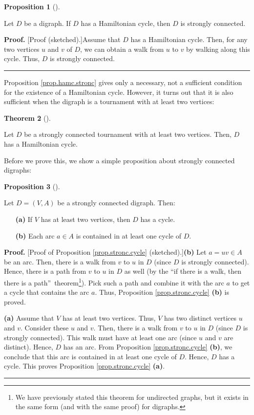 \documentclass[numbers=enddot,12pt,final,onecolumn,notitlepage]{scrartcl}%
\numberwithin{exer}{subsection}
\theoremstyle{definition}
\newtheorem{theo}{Theorem}[subsection]
\newenvironment{theorem}[1][]
{\begin{theo}[#1]\begin{leftbar}}
{\end{leftbar}\end{theo}}
\newtheorem{prop}[theo]{Proposition}
\newenvironment{proposition}[1][]
{\begin{prop}[#1]\begin{leftbar}}
{\end{leftbar}\end{prop}}
\newenvironment{proof}[1][Proof]{\noindent\textbf{#1.} }{\ \rule{0.5em}{0.5em}}
\begin{document}
\begin{proposition}
\label{prop.hamc.stronc}Let $D$ be a digraph. If $D$ has a Hamiltonian cycle,
then $D$ is strongly connected.
\end{proposition}

\begin{proof}
[Proof (sketched).]Assume that $D$ has a Hamiltonian cycle. Then, for any two
vertices $u$ and $v$ of $D$, we can obtain a walk from $u$ to $v$ by walking
along this cycle. Thus, $D$ is strongly connected.
\end{proof}

Proposition \ref{prop.hamc.stronc} gives only a necessary, not a sufficient
condition for the existence of a Hamiltonian cycle. However, it turns out that
it is also sufficient when the digraph is a tournament with at least two vertices:

\begin{theorem}
[Camion's theorem]\label{thm.hamc.camion}Let $D$ be a strongly connected
tournament with at least two vertices. Then, $D$ has a Hamiltonian cycle.
\end{theorem}

Before we prove this, we show a simple proposition about strongly connected digraphs:

\begin{proposition}
\label{prop.stronc.cycle}Let $D=\left(  V,A\right)  $ be a strongly connected
digraph. Then:

\begin{enumerate}
\item[\textbf{(a)}] If $V$ has at least two vertices, then $D$ has a cycle.

\item[\textbf{(b)}] Each arc $a\in A$ is contained in at least one cycle of
$D$.
\end{enumerate}
\end{proposition}

\begin{proof}
[Proof of Proposition \ref{prop.stronc.cycle} (sketched).]\textbf{(b)} Let
$a=uv\in A$ be an arc. Then, there is a walk from $v$ to $u$ in $D$ (since $D$
is strongly connected). Hence, there is a path from $v$ to $u$ in $D$ as well
(by the \textquotedblleft if there is a walk, then there is a
path\textquotedblright\ theorem\footnote{We have previously stated this
theorem for undirected graphs, but it exists in the same form (and with the
same proof) for digraphs.}). Pick such a path and combine it with the arc $a$
to get a cycle that contains the arc $a$. Thus, Proposition
\ref{prop.stronc.cycle} \textbf{(b)} is proved. \medskip

\textbf{(a)} Assume that $V$ has at least two vertices. Thus, $V$ has two
distinct vertices $u$ and $v$. Consider these $u$ and $v$. Then, there is a
walk from $v$ to $u$ in $D$ (since $D$ is strongly connected). This walk must
have at least one arc (since $u$ and $v$ are distinct). Hence, $D$ has an arc.
From Proposition \ref{prop.stronc.cycle} \textbf{(b)}, we conclude that this
arc is contained in at least one cycle of $D$. Hence, $D$ has a cycle. This
proves Proposition \ref{prop.stronc.cycle} \textbf{(a)}.
\end{proof}
\end{document}
